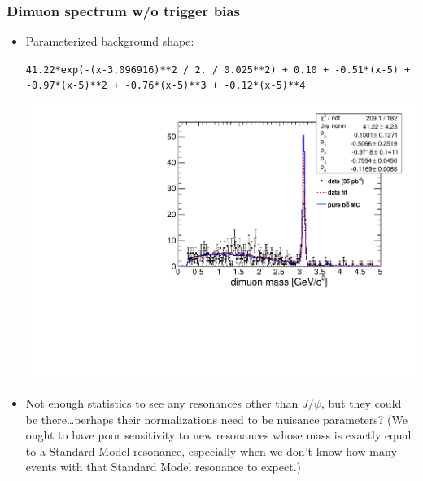 \documentclass[compress]{beamer}
\begin{document}
\begin{frame}
\frametitle{Dimuon spectrum w/o trigger bias}

\begin{itemize}

\item Parameterized background shape:

{\tt \tiny 41.22*exp(-(x-3.096916)**2 / 2. / 0.025**2) + 0.10 + -0.51*(x-5) + -0.97*(x-5)**2 + -0.76*(x-5)**3 + -0.12*(x-5)**4}

\begin{center}
\includegraphics[width=0.6\linewidth]{dimuorphan_mass_fit.pdf}
\end{center}

\item Not enough statistics to see any resonances other than $J/\psi$, but they could be there\ldots perhaps their normalizations need to be nuisance parameters?  {\scriptsize (We ought to have poor sensitivity to new resonances whose mass is exactly equal to a Standard Model resonance, especially when we don't know how many events with that Standard Model resonance to expect.)}
\end{itemize}
\end{frame}
\end{document}
